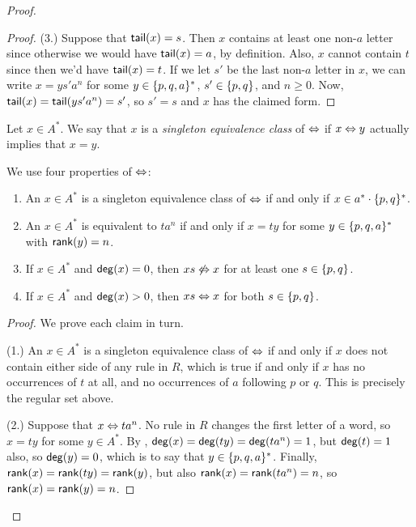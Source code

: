 \documentclass[../generics]{subfiles}
\begin{document}
\begin{proof}
\begin{proof}
\smallskip

(3.) Suppose that $\mathsf{tail}(x)=s$. Then $x$ contains at least one non-$a$ letter since otherwise we would have $\mathsf{tail}(x)=a$, by definition. Also, $x$ cannot contain $t$ since then we'd have $\mathsf{tail}(x)=t$. If we let $s'$ be the last non-$a$ letter in $x$, we can write $x=ys'a^n$ for some $y \in \{p,q,a\}^*$, $s' \in \{p,q\}$, and $n \geq 0$. Now, $\mathsf{tail}(x)=\mathsf{tail}(ys'a^n)=s'$, so $s'=s$ and $x$ has the claimed form.
\end{proof}

\begin{definition}
Let $x \in A^*$. We say that $x$ is a \emph{singleton equivalence class} of $\Leftrightarrow$ if $x \Leftrightarrow y$ actually implies that $x=y$.
\end{definition}

\begin{lemma}\label{lemma:tpqa word problem}
We use four properties of $\Leftrightarrow$:
\begin{enumerate}
\item An $x \in A^*$ is a singleton equivalence class of $\Leftrightarrow$ if and only if $x \in a^* \cdot \{p,q\}^*$.
\item An $x \in A^*$ is equivalent to $ta^n$ if and only if $x=ty$ for some $y \in \{p,q,a\}^*$ with $\mathsf{rank}(y)=n$.
\item If $x \in A^*$ and $\mathsf{deg}(x) = 0$, then $xs \not\Leftrightarrow x$ for at least one $s \in \{p,q\}$.
\item If $x \in A^*$ and $\mathsf{deg}(x) > 0$, then $xs \Leftrightarrow x$ for both $s \in \{p,q\}$.
\end{enumerate}
\end{lemma}
\begin{proof}
We prove each claim in turn.

\smallskip

(1.) An $x \in A^*$ is a singleton equivalence class of $\Leftrightarrow$ if and only if $x$ does not contain either side of any rule in $R$, which is true if and only if $x$ has no occurrences of $t$ at all, and no occurrences of $a$ following $p$ or $q$. This is precisely the regular set above.

\smallskip

(2.) Suppose that $x \Leftrightarrow ta^n$. No rule in $R$ changes the first letter of a word, so $x=ty$ for some $y \in A^*$. By , $\mathsf{deg}(x)=\mathsf{deg}(ty)=\mathsf{deg}(ta^n)=1$, but $\mathsf{deg}(t)=1$ also, so $\mathsf{deg}(y)=0$, which is to say that $y \in \{p,q,a\}^*$. Finally, $\mathsf{rank}(x)=\mathsf{rank}(ty)=\mathsf{rank}(y)$, but also $\mathsf{rank}(x)=\mathsf{rank}(ta^n)=n$, so $\mathsf{rank}(x)=\mathsf{rank}(y)=n$.


\end{proof}
\end{proof}
\end{document}
